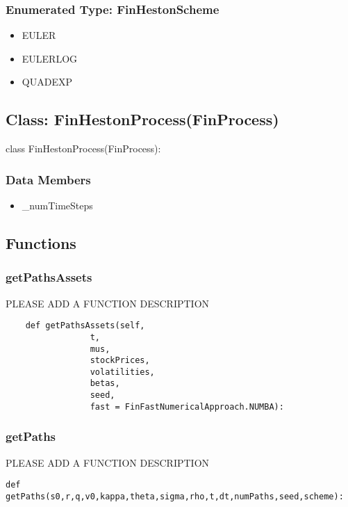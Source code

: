 \documentclass[twoside,11pt]{book}
\begin{document}
\subsubsection{Enumerated Type: FinHestonScheme}
\begin{itemize}
\item{EULER}
\item{EULERLOG}
\item{QUADEXP}
\end{itemize}

\subsection*{Class: FinHestonProcess(FinProcess)}
class FinHestonProcess(FinProcess): 

\subsubsection*{Data Members}
\begin{itemize}
\item{\_numTimeSteps}
\end{itemize}

\subsection*{Functions}

\subsubsection*{{\bf getPathsAssets}}
PLEASE ADD A FUNCTION DESCRIPTION

\begin{lstlisting}
    def getPathsAssets(self, 
                 t,
                 mus,
                 stockPrices,
                 volatilities,
                 betas,
                 seed, 
                 fast = FinFastNumericalApproach.NUMBA):
\end{lstlisting}

\subsubsection*{{\bf getPaths}}
PLEASE ADD A FUNCTION DESCRIPTION

\begin{lstlisting}
def getPaths(s0,r,q,v0,kappa,theta,sigma,rho,t,dt,numPaths,seed,scheme):
\end{lstlisting}
\end{document}
